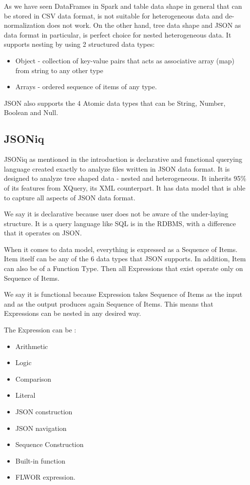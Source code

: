 As we have seen DataFrames in Spark and table data shape in general that can be stored in CSV data format, is not suitable for heterogeneous data and de-normalization does not work. On the other hand, tree data shape and JSON as data format in particular, is perfect choice for nested heterogeneous data. It supports nesting by using 2 structured data types:
\begin{itemize}
	\item Object - collection of key-value pairs that acts as associative array (map) from string to any other type 
	\item Arrays - ordered sequence of items of any type. 
\end{itemize} 

JSON also supports the 4 Atomic data types that can be String, Number, Boolean and Null.

\subsection{JSONiq}
\label{sec:JSONiq}
JSONiq \cite{JSONiqPaper} as mentioned in the introduction is declarative and functional querying language created exactly to analyze files written in JSON data format. It is designed to analyze tree shaped data - nested and heterogeneous. It inherits 95\% of its features from XQuery, its XML counterpart. It has data model that is able to capture all aspects of JSON data format. 

We say it is declarative because user does not be aware of the under-laying structure. It is a query language like SQL is in the RDBMS, with a difference that it operates on JSON.

When it comes to data model, everything is expressed as a Sequence of Items. Item itself can be any of the 6 data types that JSON supports. In addition, Item can also be of a Function Type. Then all Expressions that exist operate only on Sequence of Items. 

We say it is functional because Expression takes Sequence of Items as the input and as the output produces again Sequence of Items. This means that Expressions can be nested in any desired way.

The Expression can be :
\begin{itemize}
	\item Arithmetic
	\item Logic
	\item Comparison
	\item Literal
	\item JSON construction
	\item JSON navigation
	\item Sequence Construction
	\item Built-in function
	\item FLWOR expression.
\end{itemize} 

